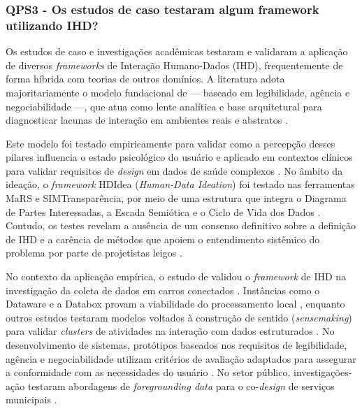\documentclass[
	12pt,				%
	oneside,			%
	a4paper,			%
	english,			%
	brazil				%
	]{abntex2ppgsi}
\begin{document}
    \subsubsection{QPS3 - Os estudos de caso testaram algum framework utilizando IHD?}

    Os estudos de caso e investigações acadêmicas testaram e validaram a aplicação de diversos \textit{frameworks} de Interação Humano-Dados (IHD), frequentemente de forma híbrida com teorias de outros domínios. A literatura adota majoritariamente o modelo fundacional de  — baseado em legibilidade, agência e negociabilidade —, que atua como lente analítica e base arquitetural para diagnosticar lacunas de interação em ambientes reais e abstratos \cite{DOWTHWAITE2024, Lenzi2024, Burzio2024, Meechan2023, Victorelli2023Evaluating, Pilling2022MoreThan, Sailaja2021, Lockwood2021, Crabtree2021, Zou2020769, Victorelli2020Human, Locoro2020, Lockwood2020AnAccessible, Strey2019Human}.

    Este modelo foi testado empiricamente para validar como a percepção desses pilares influencia o estado psicológico do usuário e aplicado em contextos clínicos para validar requisitos de \textit{design} em dados de saúde complexos \cite{cezar2023cognitive, sailaja2021exploring}. No âmbito da ideação, o \textit{framework} HDIdea (\textit{Human-Data Ideation}) foi testado nas ferramentas MaRS e SIMTransparência, por meio de uma estrutura que integra o Diagrama de Partes Interessadas, a Escada Semiótica e o Ciclo de Vida dos Dados \cite{Strey2019Human}. Contudo, os testes revelam a ausência de um consenso definitivo sobre a definição de IHD e a carência de métodos que apoiem o entendimento sistêmico do problema por parte de projetistas leigos \cite{Strey2019Human}.

    No contexto da aplicação empírica, o estudo de  validou o \textit{framework} de IHD na investigação da coleta de dados em carros conectados \cite{DOWTHWAITE2024, Locoro2020}. Instâncias como o Dataware e a Databox provam a viabilidade do processamento local \cite{Crabtree2016}, enquanto outros estudos testaram modelos voltados à construção de sentido (\textit{sensemaking}) para validar \textit{clusters} de atividades na interação com dados estruturados \cite{Koesten2021}. No desenvolvimento de sistemas, protótipos baseados nos requisitos de legibilidade, agência e negociabilidade utilizam critérios de avaliação adaptados para assegurar a conformidade com as necessidades do usuário \cite{Belizario2023Interacao}. No setor público, investigações-ação testaram abordagens de \textit{foregrounding data} para o co-\textit{design} de serviços municipais \cite{seidelin2020foregrounding}.
\end{document}
